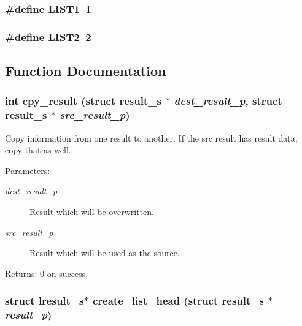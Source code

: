 \subsubsection{\setlength{\rightskip}{0pt plus 5cm}\#define LIST1~1}\label{llist_8c_b15b0d7accecbf48738cf8e183d40d90}


\subsubsection{\setlength{\rightskip}{0pt plus 5cm}\#define LIST2~2}\label{llist_8c_6d580a8fdbef081d9a29102d9ccd9c20}




\subsection{Function Documentation}
\subsubsection{\setlength{\rightskip}{0pt plus 5cm}int cpy\_\-result (struct \bf{result\_\-s} $\ast$ {\em dest\_\-result\_\-p}, struct \bf{result\_\-s} $\ast$ {\em src\_\-result\_\-p})}\label{llist_8c_b0d6e6a78fceaae23acdbf75b6ad5344}


Copy information from one result to another. If the src result has result data, copy that as well.

\begin{Desc}
\item[Parameters:]
\begin{description}
\item[{\em dest\_\-result\_\-p}]Result which will be overwritten. \item[{\em src\_\-result\_\-p}]Result which will be used as the source. \end{description}
\end{Desc}
\begin{Desc}
\item[Returns:]0 on success. \end{Desc}
\subsubsection{\setlength{\rightskip}{0pt plus 5cm}struct \bf{lresult\_\-s}$\ast$ create\_\-list\_\-head (struct \bf{result\_\-s} $\ast$ {\em result\_\-p})}\label{llist_8c_ad1ce48b90bbd19f253efaf8ec25a085}


